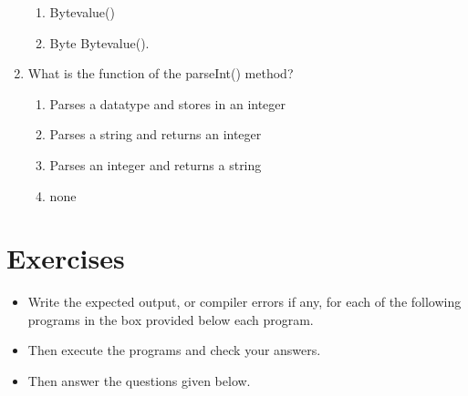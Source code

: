 \documentclass[11pt,a4paper]{article}
\begin{document}
\begin{enumerate}
\begin{enumerate}
         \item Bytevalue()
         \item Byte Bytevalue().
     \end{enumerate}
 \item What is the function of the parseInt() method?
     \begin{enumerate}
         \item Parses a datatype and stores in an integer
         \item Parses a string and returns an integer
         \item Parses an integer and returns a string
         \item none
     \end{enumerate}
 
\end{enumerate}
\section*{Exercises}
\begin{itemize}
    \item Write the expected output, or compiler errors if any, for each of the following programs in the box provided below each program.
    \item Then execute the programs and check your answers.
    \item Then answer the questions given below.
\end{itemize}
\end{document}
